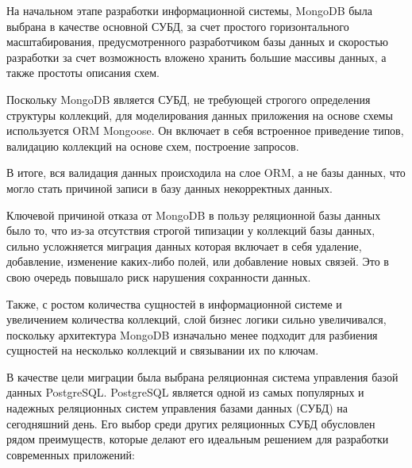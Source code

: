 На начальном этапе разработки информационной системы, MongoDB была выбрана в качестве основной СУБД, за счет простого горизонтального масштабирования, предусмотренного разработчиком базы данных и скоростью разработки за счет возможность вложено хранить большие массивы данных, а также простоты описания схем.

Поскольку MongoDB является СУБД, не требующей строгого определения структуры коллекций, для моделирования данных приложения на основе схемы используется ORM Mongoose. Он включает в себя встроенное приведение типов, валидацию коллекций на основе схем, построение запросов.

В итоге, вся валидация данных происходила на слое ORM, а не базы данных, что могло стать причиной записи в базу данных некорректных данных.

Ключевой причиной отказа от MongoDB в пользу реляционной базы данных было то, что из-за отсутствия строгой типизации у коллекций базы данных, сильно усложняется миграция данных которая включает в себя удаление, добавление, изменение каких-либо полей, или добавление новых связей. Это в свою очередь повышало риск нарушения сохранности данных.

Также, с ростом количества сущностей в информационной системе и увеличением количества коллекций, слой бизнес логики сильно увеличивался, поскольку архитектура MongoDB изначально менее подходит для разбиения сущностей на несколько коллекций и связывании их по ключам.

В качестве цели миграции была выбрана реляционная система управления базой данных PostgreSQL. PostgreSQL является одной из самых популярных и надежных реляционных систем управления базами данных (СУБД) на сегодняшний день. Его выбор среди других реляционных СУБД обусловлен рядом преимуществ, которые делают его идеальным решением для разработки современных приложений:


